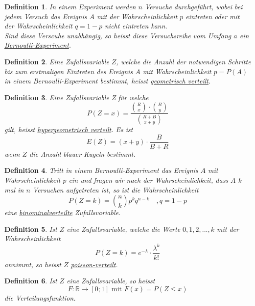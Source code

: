\documentclass{article}
\newtheorem{mydef}{Definition}
\begin{document}
\begin{mydef}
In einem Experiment werden $n$ Versuche durchgeführt, wobei bei jedem Versuch das Ereignis $A$ mit der Wahrscheinlichkeit $p$ eintreten oder mit der Wahrscheinlichkeit $q = 1-p$ nicht eintreten kann.\\
Sind diese Verscuhe unabhängig, so heisst diese Versuchsreihe vom Umfang $a$ ein \underline{Bernoulli-Experiment}.
\end{mydef}
\begin{mydef}
Eine Zufallsvariable $Z$, welche die Anzahl der notwendigen Schritte bis zum erstmaligen Eintreten des Ereignis $A$ mit Wahrscheinlichkeit $p = P(A)$ in einem Bernoulli-Experiment bestimmt, heisst \underline{geometrisch verteilt}.
\end{mydef}
\begin{mydef}
Eine Zufallsvariable Z für welche
\begin{equation}
P(Z=x) = \frac{\binom{R}{x} \cdot \binom{B}{y}}{\binom{R+B}{x+y}}
\end{equation}
gilt, heisst \underline{hypergeometrisch verteilt}. Es ist
\begin{equation}
E(Z) = (x+y) \cdot \frac{B}{B+R}
\end{equation}
wenn $Z$ die Anzahl blauer Kugeln bestimmt.
\end{mydef}
\begin{mydef}Tritt in einem Bernoulli-Experiment das Ereignis $A$ mit Wahrscheinlichkeit $p$ ein und fragen wir nach der Wahrscheinlichkeit, dass $A$ k-mal in $n$ Versuchen aufgetreten ist, so ist die Wahrscheinlichkeit
\begin{equation}
P(Z=k) = \binom{n}{k} p^kq^{n-k} \quad , q=1-p
\end{equation}
eine \underline{binominalverteilte} Zufallsvariable.
\end{mydef}
\begin{mydef}
Ist $Z$ eine Zufallsvariable, welche die Werte $0, 1, 2, ..., k$ mit der Wahrscheinlichkeit
\begin{equation}
P(Z=k) = e^{-\lambda} \cdot \frac{\lambda^k}{k!}
\end{equation}
annimmt, so heisst $Z$ \underline{poisson-verteilt}.
\end{mydef}
\begin{mydef}
Ist $Z$ eine Zufallsvariable, so heisst
\begin{equation}
F: \mathbb{R} \longrightarrow [0;1] \mbox{ mit } F(x) = P(Z \leq x)
\end{equation}
die Verteilungsfunktion.
\end{mydef}
\end{document}
